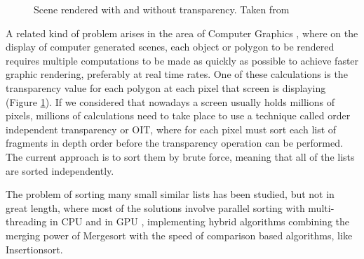 \documentclass[a4paper,12pt]{article}
\begin{document}
\begin{figure}[H]
\centering
{}
\hfill %
\caption{Scene rendered with and without transparency. Taken from \cite{Arch2015}}
\label{fig:Transp}
\end{figure}

A related kind of problem arises in the area of Computer Graphics \cite{Arch2015}, where on the display of computer generated scenes, each object or polygon to be rendered requires multiple computations to be made as quickly as possible to achieve faster graphic rendering, preferably at real time rates. One of these calculations is the transparency value for each polygon at each pixel that screen is displaying (Figure \ref{fig:Transp}). If we considered that nowadays a screen usually holds millions of pixels, millions of calculations need to take place to use a technique called order independent transparency or OIT, where for each pixel must sort each list of fragments  in depth order before the transparency operation can be performed. The current approach is to sort them by brute force, meaning that all of the lists are sorted independently.

The problem of sorting many small similar lists  has been studied, but not in great length, where most of the solutions involve parallel sorting with multi-threading in CPU \cite{han2002integer} and in GPU \cite{hou2017fast},  implementing hybrid algorithms combining the merging power of Mergesort with the speed of comparison based algorithms, like Insertionsort. 
\\
\end{document}

